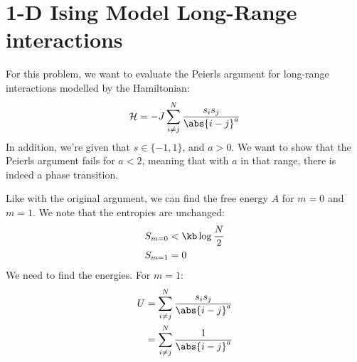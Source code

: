 \documentclass[../../PS3.tex]{subfiles}
\begin{document}
\section{1-D Ising Model Long-Range interactions}

For this problem, we want to evaluate the Peierls argument for long-range interactions modelled by the Hamiltonian:
\begin{equation}
	\ham = -J \sum_{i\neq j}^N \frac{s_i s_j }{\abs{i-j}^a}
\end{equation}
In addition, we're given that $s \in \{-1, 1\}$, and $a > 0$. We want to show that the Peierls argument fails for $a < 2$, meaning that with $a$ in that range, there is indeed a phase transition. 

Like with the original argument, we can find the free energy $A$ for $m = 0$ and $m = 1$. We note that the entropies are unchanged: 
\begin{align}
	S_{m = 0} &< \kb \log \frac{N}{2} \\
	S_{m = 1} &= 0
\end{align}
We need to find the energies. For $m = 1$:
\begin{align}
	U &=  \sum_{i\neq j}^N \frac{s_i s_j }{\abs{i-j}^a} \\
	&= \sum_{i\neq j}^N \frac{1}{\abs{i-j}^a} \\
\end{align}
\end{document}
